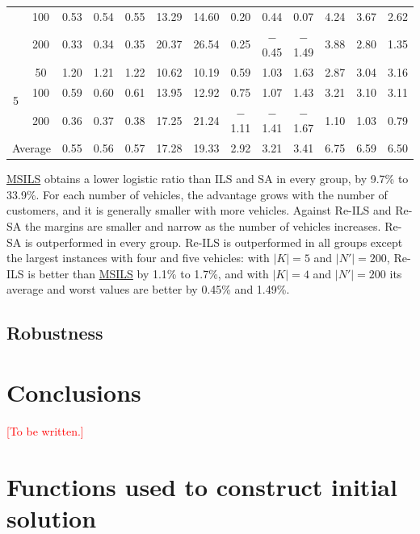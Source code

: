 \documentclass{article}
\begin{document}
\begin{table}[htbp]
{\begin{tabular}{cc ccc cc ccc ccc}
                   & 100 & 0.53 & 0.54 & 0.55 & 13.29 & 14.60 & 0.20 & 0.44 & 0.07 & 4.24 & 3.67 & 2.62 \\
                   & 200 & 0.33 & 0.34 & 0.35 & 20.37 & 26.54 & 0.25 & $-$0.45 & $-$1.49 & 3.88 & 2.80 & 1.35 \\
\midrule
\multirow{3}{*}{5} & 50  & 1.20 & 1.21 & 1.22 & 10.62 & 10.19 & 0.59 & 1.03 & 1.63 & 2.87 & 3.04 & 3.16 \\
                   & 100 & 0.59 & 0.60 & 0.61 & 13.95 & 12.92 & 0.75 & 1.07 & 1.43 & 3.21 & 3.10 & 3.11 \\
                   & 200 & 0.36 & 0.37 & 0.38 & 17.25 & 21.24 & $-$1.11 & $-$1.41 & $-$1.67 & 1.10 & 1.03 & 0.79 \\
\midrule
\multicolumn{2}{c}{Average} & 0.55 & 0.56 & 0.57 & 17.28 & 19.33 & 2.92 & 3.21 & 3.41 & 6.75 & 6.59 & 6.50 \\
\bottomrule
\end{tabular}%
}
\end{table}

\hyperref[alg:MSILS]{MSILS} obtains a lower logistic ratio than ILS and SA
\citep{alvarez2018iterated} in every group, by 9.7\% to 33.9\%. For each
number of vehicles, the advantage grows with the number of customers, and it
is generally smaller with more vehicles. Against Re-ILS and Re-SA the margins
are smaller and narrow as the number of vehicles increases. Re-SA is
outperformed in every group. Re-ILS is
outperformed in all groups except the largest instances with four and five
vehicles: with $|K|=5$ and $|N'|=200$, Re-ILS is better than
\hyperref[alg:MSILS]{MSILS} by 1.1\% to 1.7\%, and with $|K|=4$ and
$|N'|=200$ its average and worst values are better by 0.45\% and 1.49\%.



\subsection{Robustness} \label{Robustness}

\section{Conclusions}\label{sec:conclusion}

\textcolor{red}{[To be written.]}

\appendix

\section{Functions used to construct initial solution}
\end{document}
